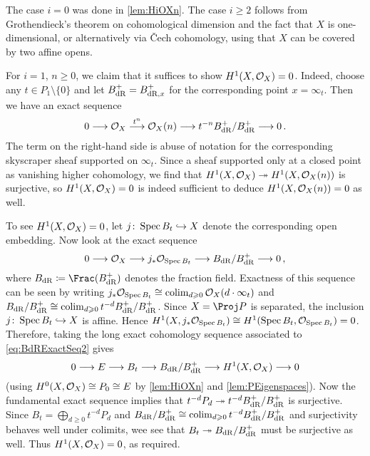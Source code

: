 \documentclass[a4paper, 10pt, oneside, DIV=9, chapterprefix=true, numbers=enddot,bibliography=totoc]{scrbook}
\begin{document}
\begin{proof*}
	The case $i=0$ was done in \cref{lem:HiOXn}. The case $i\geq 2$ follows from Grothendieck's theorem on cohomological dimension and the fact that $X$ is one-dimensional, or alternatively via \v Cech cohomology, using that $X$ can be covered by two affine opens.
	
	For $i=1$, $n\geq 0$, we claim that it suffices to show $H^1(X,\mathcal{O}_X)=0$. Indeed, choose any $t\in P_1\setminus\{0\}$ and let $B_{\mathrm{dR}}^+=B_{\mathrm{dR},x}^+$ for the corresponding point $x=\infty_t$. Then we have an exact sequence
	\begin{equation}\label{eq:BdRExactSeq1}
		0\morphism \Oo_X\morphism[t^n]\Oo_X(n)\morphism t^{-n}B_{\dR}^+/B_{\dR}^+\morphism 0\,.
	\end{equation}
	The term on the right-hand side is abuse of notation for the corresponding skyscraper sheaf supported on $\infty_t$. Since a sheaf supported only at a closed point as vanishing higher cohomology, we find that $H^1(X,\Oo_X)\epimorphism H^1(X,\Oo_X(n))$ is surjective, so $H^1(X,\mathcal{O}_X)=0$ is indeed sufficient to deduce $H^1(X,\mathcal{O}_X(n))=0$ as well.
	
	To see $H^1(X,\mathcal{O}_X)=0$, let $j\colon \Spec B_t\monomorphism X$ denote the corresponding open embedding. Now look at the exact sequence
	\begin{equation}\label{eq:BdRExactSeq2}
		0\morphism \Oo_X\morphism j_*\Oo_{\Spec B_t}\morphism B_{\dR}/B^+_\dR\morphism 0\,,
	\end{equation} 
	where $B_\dR\coloneqq \Frac(B^+_\dR)$ denotes the fraction field. Exactness of this sequence can be seen by writing $j_*\mathcal{O}_{\operatorname{Spec} B_t}\cong \operatorname*{colim}_{d\geqslant 0}\mathcal{O}_X(d\cdot \infty_t)$ and $B_{\mathrm{dR}}/B_{\mathrm{dR}}^+\cong \operatorname*{colim}_{d\geqslant 0}t^{-d}B_{\mathrm{dR}}^+/B_{\mathrm{dR}}^+$. Since $X=\Proj P$ is separated, the inclusion $j\colon \Spec B_t\monomorphism X$ is affine. Hence $H^1(X,j_*\mathcal{O}_{\operatorname{Spec} B_t})\cong H^1(\operatorname{Spec} B_t,\mathcal{O}_{\operatorname{Spec} B_t})=0$. Therefore, taking the long exact cohomology sequence associated to \cref{eq:BdRExactSeq2} gives
	\begin{equation*}
		0\morphism E\morphism B_t\morphism B_\dR/B_\dR^+\morphism H^1(X,\Oo_X)\morphism 0
	\end{equation*}
	(using $H^0(X,\mathcal{O}_X)\cong P_0\cong E$ by \cref{lem:HiOXn} and \cref{lem:PEigenspaces}). Now the fundamental exact sequence implies that $t^{-d}P_d\epimorphism t^{-d}B_\dR^+/B_\dR^+$ is surjective. Since $B_t=\bigoplus_{d\geq 0}t^{-d}P_d$ and $B_{\mathrm{dR}}/B_{\mathrm{dR}}^+\cong \operatorname*{colim}_{d\geqslant 0}t^{-d}B_{\mathrm{dR}}^+/B_{\mathrm{dR}}^+$ and surjectivity behaves well under colimits, wee see that $B_t\epimorphism B_\dR/B_\dR^+$ must be surjective as well. Thus $H^1(X,\mathcal{O}_X)=0$, as required.
	

\end{proof*}
\end{document}
